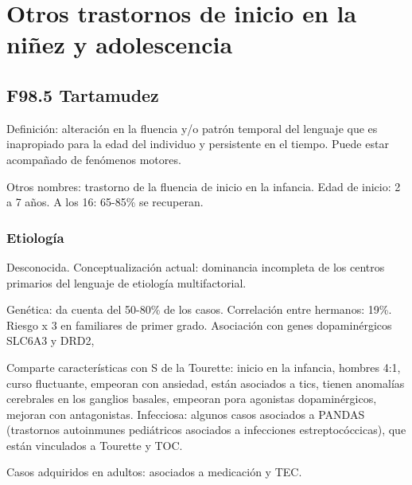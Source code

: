 \chapter{Otros trastornos de inicio en la niñez y adolescencia}
\section*{F98.5 Tartamudez}
Definición: alteración en la fluencia y/o patrón temporal del lenguaje que es inapropiado para la edad del individuo y persistente en el tiempo. Puede estar acompañado de fenómenos motores.

Otros nombres: trastorno de la fluencia de inicio en la infancia.
Edad de inicio: 2 a 7 años. A los 16: 65-85\% se recuperan.
\subsection*{Etiología}
Desconocida. Conceptualización actual: dominancia incompleta de los centros primarios del lenguaje de etiología multifactorial.

Genética: da cuenta del 50-80\% de los casos. Correlación entre hermanos: 19\%. Riesgo x 3 en familiares de primer grado. Asociación con genes dopaminérgicos SLC6A3 y DRD2,

Comparte características con S de la Tourette: inicio en la infancia, hombres 4:1, curso fluctuante, empeoran con ansiedad, están asociados a tics, tienen anomalías cerebrales en los ganglios basales, empeoran pora agonistas dopaminérgicos, mejoran con antagonistas.
Infecciosa: algunos casos asociados a PANDAS (trastornos autoinmunes pediátricos asociados a infecciones estreptocóccicas), que están vinculados a Tourette y TOC.

Casos adquiridos en adultos: asociados a medicación y TEC.
